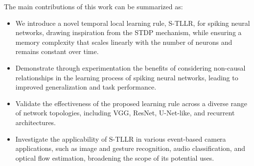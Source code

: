 \documentclass[10pt]{article} %
\begin{document}
    
    
    The main contributions of this work can be summarized as:
    \begin{itemize}
        \item We introduce a novel temporal local learning rule, S-TLLR, for spiking neural networks, drawing inspiration from the STDP mechanism, while ensuring a memory complexity that scales linearly with the number of neurons and remains constant over time.
        \item Demonstrate through experimentation the benefits of considering non-causal relationships in the learning process of spiking neural networks, leading to improved generalization and task performance.
        \item Validate the effectiveness of the proposed learning rule across a diverse range of network topologies, including VGG, ResNet, U-Net-like, and recurrent architectures.
        \item Investigate the applicability of S-TLLR in various event-based camera applications, such as image and gesture recognition, audio classification, and optical flow estimation, broadening the scope of its potential uses.
    \end{itemize}


\end{document}
